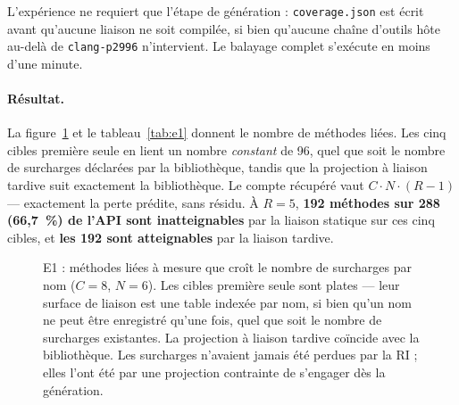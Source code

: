 \documentclass[11pt,a4paper]{article}
\newcommand{\code}[1]{\texttt{\small #1}}
\begin{document}
L'expérience ne requiert que l'étape de génération : \code{coverage.json} est
écrit avant qu'aucune liaison ne soit compilée, si bien qu'aucune chaîne d'outils
hôte au-delà de \code{clang-p2996} n'intervient. Le balayage complet s'exécute en
moins d'une minute.

\paragraph{Résultat.} La figure~\ref{fig:e1} et le tableau~\ref{tab:e1} donnent
le nombre de méthodes liées. Les cinq cibles \og première seule \fg{} en lient un
nombre \emph{constant} de 96, quel que soit le nombre de surcharges déclarées par
la bibliothèque, tandis que la projection à liaison tardive suit exactement la
bibliothèque. Le compte récupéré vaut $C\cdot N\cdot(R-1)$ --- exactement la
perte prédite, sans résidu. À $R=5$, \textbf{192 méthodes sur 288 (66,7~\%) de
l'API sont inatteignables} par la liaison statique sur ces cinq cibles, et
\textbf{les 192 sont atteignables} par la liaison tardive.

\begin{figure}[h]
\centering
{}
\caption{E1 : méthodes liées à mesure que croît le nombre de surcharges par nom
($C=8$, $N=6$). Les cibles \og première seule \fg{} sont plates --- leur surface
de liaison est une table indexée par nom, si bien qu'un nom ne peut être
enregistré qu'une fois, quel que soit le nombre de surcharges existantes. La
projection à liaison tardive coïncide avec la bibliothèque. Les surcharges
n'avaient jamais été perdues par la RI ; elles l'ont été par une projection
contrainte de s'engager dès la génération.}
\label{fig:e1}
\end{figure}
\end{document}
